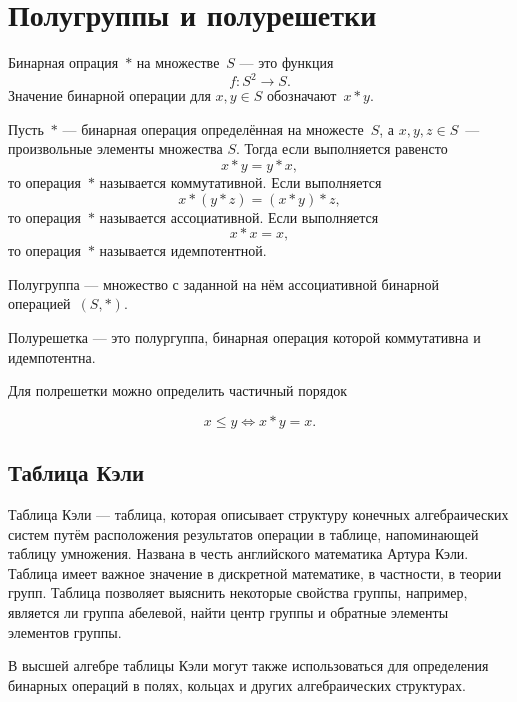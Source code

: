 \chapter{Полугруппы и полурешетки}

\begin{my_def}
Бинарная опрация~$*$ на множестве~$S$ --- это функция
$$f: S^2 \rightarrow S.$$
Значение бинарной операции для $x, y \in S$ обозначают~$x * y$.
\end{my_def}


\begin{my_def}
Пусть~$*$ --- бинарная операция определённая на множесте~$S$, а
$x, y, z \in S$~--- произвольные элементы множества $S$. Тогда если
выполняется равенсто
$$x * y = y * x,$$
то операция~$*$ называется коммутативной.
Если выполняется
$$
x * (y * z) = (x * y) * z,
$$
то операция~$*$ называется ассоциативной.
Если выполняется
$$
x * x = x,
$$
то операция~$*$ называется идемпотентной.
\end{my_def}


\begin{my_def}
Полугруппа --- множество с заданной на нём ассоциативной бинарной операцией~$(S,*)$.
\end{my_def}


\begin{my_def}
Полурешетка --- это полургуппа, бинарная операция которой коммутативна и
идемпотентна.
\end{my_def}

Для полрешетки можно определить частичный порядок

$$x \leq y \Leftrightarrow x*y=x.$$

\section{Таблица Кэли}

Таблица Кэли --- таблица, которая описывает структуру конечных алгебраических систем путём расположения результатов операции в таблице, напоминающей таблицу умножения. Названа в честь английского математика Артура Кэли. Таблица имеет важное значение в дискретной математике, в частности, в теории групп. Таблица позволяет выяснить некоторые свойства группы, например, является ли группа абелевой, найти центр группы и обратные элементы элементов группы.

В высшей алгебре таблицы Кэли могут также использоваться для определения бинарных операций в полях, кольцах и других алгебраических структурах.

